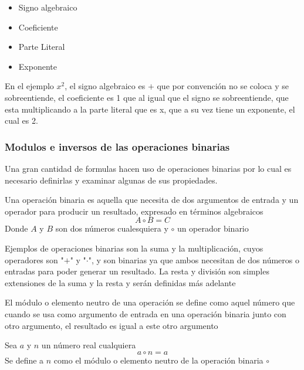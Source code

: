 \documentclass[11pt,letterpaper]{article}
\begin{document}
	\begin{itemize}
		\item Signo algebraico
		\item Coeficiente
		\item Parte Literal
		\item Exponente
	\end{itemize}
	
	En el ejemplo $x^2$, el signo algebraico es $+$ que por convención no se coloca y se sobreentiende, el coeficiente es 1 que al igual que el signo se sobreentiende, que esta multiplicando a la parte literal que es x, que a su vez tiene un exponente, el cual es 2.
	
	\subsubsection{Modulos e inversos de las operaciones binarias}
	
	Una gran cantidad de formulas hacen uso de operaciones binarias por lo cual es necesario definirlas y examinar algunas de sus propiedades.
	
	\begin{definición}
		Una operación binaria es aquella que necesita de dos argumentos de entrada y un operador para producir un resultado, expresado en términos algebraicos
		\begin{equation}
			A \circ B = C
		\end{equation}
		Donde $A$ y $B$ son dos números cualesquiera y $\circ$ un operador binario
	\end{definición}

	Ejemplos de operaciones binarias son la suma y la multiplicación, cuyos operadores son "$+$" y "$\cdot$", y son binarias ya que ambos necesitan de dos números o entradas para poder generar un resultado. La resta y división son simples extensiones de la suma y la resta y serán definidas más adelante
	
	El módulo o elemento neutro de una operación se define como aquel número que cuando se usa como argumento de entrada en una operación binaria junto con otro argumento, el resultado es igual a este otro argumento
	
	\begin{definición}
		Sea $a$ y $n$ un número real cualquiera  
		\begin{equation}
			a \circ n = a \label{aria}
		\end{equation}
		Se define a $n$ como el módulo o elemento neutro de la operación binaria $\circ$
	\end{definición}


	
	\printbibliography[title={Referencias}]
	
\end{document}
